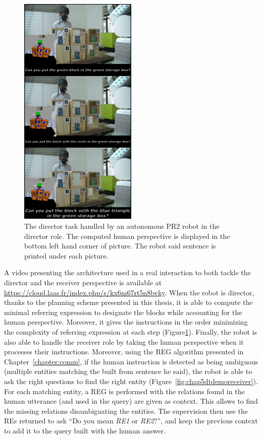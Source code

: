 \documentclass[a4paper,11pt,twoside]{StyleThese}
\begin{document}
\begin{figure}[hbtp]
\centering
\includegraphics[width=0.5\textwidth]{figures/chapter5/dt_demo.png}
\caption{The director task handled by an autonomous PR2 robot in the director role. The computed human perspective is displayed in the bottom left hand corner of picture. The robot said sentence is printed under each picture.}
\label{fig:chap5dtdemodirector}
\end{figure}

A video presenting the architecture used in a real interaction to both tackle the director and the receiver perspective is available at \url{https://cloud.laas.fr/index.php/s/kx6m67rt5n8bvky}. When the robot is director, thanks to the planning scheme presented in this thesis, it is able to compute the minimal referring expression to designate the blocks while accounting for the human perspective. Moreover, it gives the instructions in the order minimizing the complexity of referring expression at each step (Figure\ref{fig:chap5dtdemodirector}). Finally, the robot is also able to handle the receiver role  by taking the human perspective when it processes their instructions. Moreover, using the REG algorithm presented in Chapter~\ref{chapter:comm}, if the human instruction is detected as being ambiguous (multiple entities matching the \sparql{} built from sentence he said), the robot is able to ask the right questions to find the right entity (Figure~\ref{fig:chap5dtdemoreceiver}). For each matching entity, a REG is performed with the relations found in the human utterance (and used in the \sparql{} query) are given as context. This allows to find the missing relations disambiguating the entities. The supervision then use the REs returned to ask ``Do you mean \textit{RE1} or \textit{RE2}?'', and keep the previous context to add it to the \sparql{} query built with the human answer.
\end{document}
